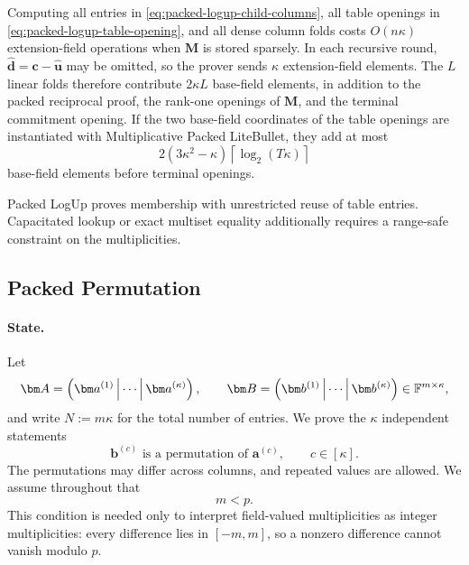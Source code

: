 \documentclass[runningheads]{llncs}
\begin{document}
Computing all entries in \eqref{eq:packed-logup-child-columns}, all
table openings in \eqref{eq:packed-logup-table-opening}, and all dense
column folds costs \(O(n\kappa)\) extension-field operations when
\(\bm M\) is stored sparsely.  In each recursive round,
\(\widehat{\bm d}=\bm c-\widehat{\bm u}\) may be omitted, so the prover
sends \(\kappa\) extension-field elements.  The \(L\) linear folds
therefore contribute \(2\kappa L\) base-field elements, in addition to
the packed reciprocal proof, the rank-one openings of \(\bm M\), and
the terminal commitment opening.  If the two base-field coordinates of
the table openings are instantiated with Multiplicative Packed
LiteBullet, they add at most
\[
    2(3\kappa^2-\kappa)
      \left\lceil\log_2(T\kappa)\right\rceil
\]
base-field elements before terminal openings.

Packed LogUp proves membership with unrestricted reuse of table
entries.  Capacitated lookup or exact multiset equality additionally
requires a range-safe constraint on the multiplicities.


\subsection{Packed Permutation}
\label{sec:packed-permutation}

\paragraph{State.}
Let
\[
    \bm A=
      \left(\bm a^{(1)}\,\middle|\,\cdots\,\middle|\,
      \bm a^{(\kappa)}\right),
    \qquad
    \bm B=
      \left(\bm b^{(1)}\,\middle|\,\cdots\,\middle|\,
      \bm b^{(\kappa)}\right)
      \in\Field^{m\times\kappa},
\]
and write \(N:=m\kappa\) for the total number of entries.  We prove
the \(\kappa\) independent statements
\begin{equation}
    \bm b^{(c)}
      \text{ is a permutation of }
    \bm a^{(c)},
    \qquad c\in[\kappa].
\label{eq:packed-permutation-column-statements}
\end{equation}
The permutations may differ across columns, and repeated values are
allowed.  We assume throughout that
\begin{equation}
    m<p.
\label{eq:packed-permutation-channel-bound}
\end{equation}
This condition is needed only to interpret field-valued multiplicities
as integer multiplicities: every difference lies in \([-m,m]\), so a
nonzero difference cannot vanish modulo \(p\).
\end{document}
